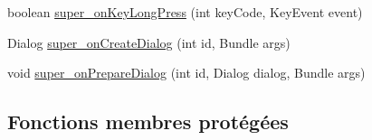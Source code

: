 \begin{DoxyCompactItemize}
\item 
boolean \hyperlink{classorg_1_1qtproject_1_1qt5_1_1android_1_1bindings_1_1_qt_activity_ad723f98cf99880c9467f96f73fa25878}{super\-\_\-on\-Key\-Long\-Press} (int key\-Code, Key\-Event event)
\item 
Dialog \hyperlink{classorg_1_1qtproject_1_1qt5_1_1android_1_1bindings_1_1_qt_activity_a814d7e98bb1c0355ed33457de6718bee}{super\-\_\-on\-Create\-Dialog} (int id, Bundle args)
\item 
void \hyperlink{classorg_1_1qtproject_1_1qt5_1_1android_1_1bindings_1_1_qt_activity_a385e763c50fd7d00213fe961bba46ed5}{super\-\_\-on\-Prepare\-Dialog} (int id, Dialog dialog, Bundle args)
\end{DoxyCompactItemize}
\subsection*{Fonctions membres protégées}
